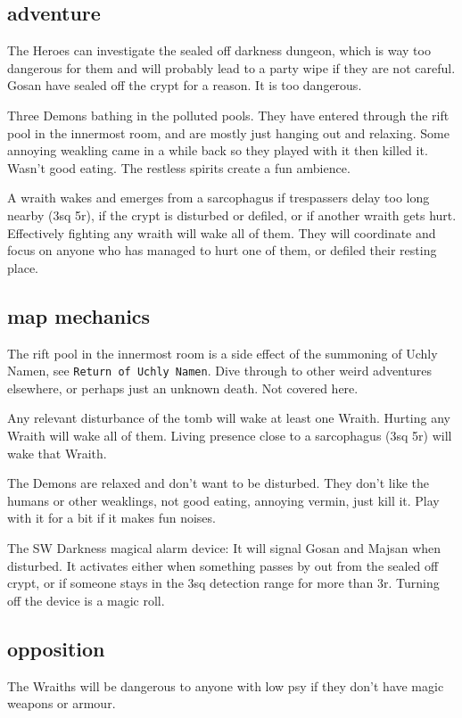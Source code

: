 \subsection*{adventure}
The Heroes can investigate the sealed off darkness dungeon, which is way too dangerous for them and will probably lead to a party wipe if they are not careful. Gosan have sealed off the crypt for a reason. It is too dangerous.

Three Demons bathing in the polluted pools. They have entered through the rift pool in the innermost room, and are mostly just hanging out and relaxing. Some annoying weakling came in a while back so they played with it then killed it. Wasn't good eating. The restless spirits create a fun ambience.

A wraith wakes and emerges from a sarcophagus if trespassers delay too long nearby (3sq 5r), if the crypt is disturbed or defiled, or if another wraith gets hurt. Effectively fighting any wraith will wake all of them. They will coordinate and focus on anyone who has managed to hurt one of them, or defiled their resting place.


\subsection*{map mechanics}
The rift pool in the innermost room is a side effect of the summoning of Uchly Namen, see \texttt{Return of Uchly Namen}. Dive through to other weird adventures elsewhere, or perhaps just an unknown death. Not covered here.

Any relevant disturbance of the tomb will wake at least one Wraith. Hurting any Wraith will wake all of them. Living presence close to a sarcophagus (3sq 5r) will wake that Wraith.

The Demons are relaxed and don't want to be disturbed. They don't like the humans or other weaklings, not good eating, annoying vermin, just kill it. Play with it for a bit if it makes fun noises.

The SW Darkness magical alarm device: It will signal Gosan and Majsan when disturbed. It activates either when something passes by out from the sealed off crypt, or if someone stays in the 3sq detection range for more than 3r.
Turning off the device is a magic roll.


\subsection*{opposition}
The Wraiths will be dangerous to anyone with low psy if they don't have magic weapons or armour.

